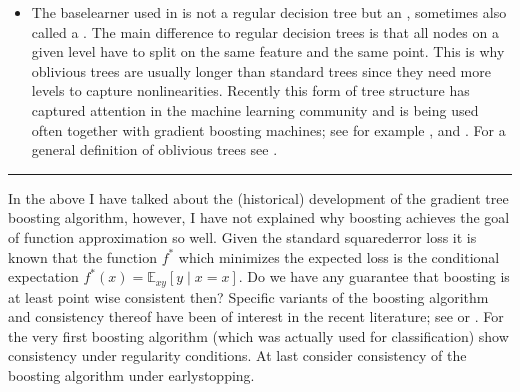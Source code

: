 \documentclass[letterpaper,10pt,english]{sphinxmanual}
\begin{document}
\begin{itemize}
\item {} 
The base\sphinxhyphen{}learner used in  is not a regular decision tree but an , sometimes also called a . The main difference to regular decision trees is that all nodes on a given level have to split on the same feature and the same point. This is why oblivious trees are usually longer than standard trees since they need more levels to capture non\sphinxhyphen{}linearities. Recently this form of tree structure has captured attention in the machine learning community and is being used often together with gradient boosting machines; see for example ,  and . For a general definition of oblivious trees see .

\end{itemize}


\bigskip\hrule\bigskip



In the above I have talked about the (historical) development of the gradient tree boosting algorithm, however, I have not explained why boosting achieves the goal of function approximation so well. Given the standard squared\sphinxhyphen{}error loss it is known that the function \(f^*\) which minimizes the expected loss is the conditional expectation \(f^*(x) = \mathbb{E}_{xy}\left[y \mid x=x\right]\). Do we have any guarantee that boosting is at least point wise consistent then? Specific variants of the boosting algorithm and consistency thereof have been of interest in the recent literature; see  or . For the very first boosting algorithm (which was actually used for classification)  show consistency under regularity conditions. At last  consider consistency of the boosting algorithm under early\sphinxhyphen{}stopping.
\end{document}
